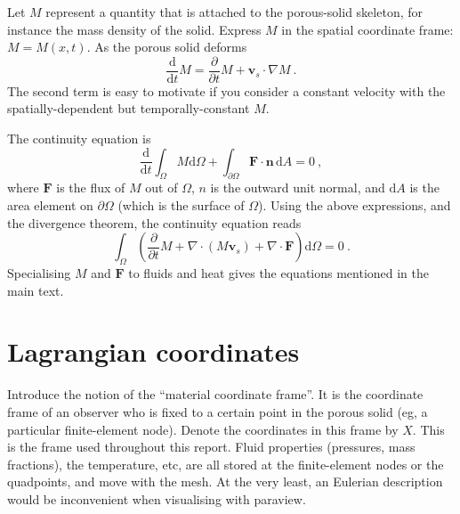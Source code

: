 \documentclass[12pt]{report}
\def\d{\mathrm{d}}
\begin{document}
Let $M$ represent a quantity that is attached to the porous-solid
skeleton, for instance the mass density of the solid.  Express $M$ in
the spatial coordinate frame: $M=M(x, t)$.  As the porous
solid deforms
\begin{equation}
\frac{\d}{\d t}M = \frac{\partial}{\partial t}M + {\mathbf v}_{s}\cdot
\nabla M \ .
\end{equation}
The second term is easy to motivate if you consider a constant
velocity with the spatially-dependent but temporally-constant $M$.

The continuity equation is
\begin{equation}
\frac{\d}{\d t}\int_{\Omega}M \d\Omega + \int_{\partial
  \Omega}{\mathbf F}\cdot{\mathbf n}\,\d A = 0 \ ,
\end{equation}
where ${\mathbf F}$ is the flux of $M$ out of $\Omega$, $n$ is the
outward unit normal, and $\d A$ is the area element on
$\partial\Omega$ (which is the surface of $\Omega$).  Using the above
expressions, and the divergence theorem, the continuity equation reads
\begin{equation}
\int_{\Omega} \left( \frac{\partial}{\partial t}M + \nabla\cdot(M{\mathbf
  v}_{s}) + \nabla\cdot{\mathbf F}  \right)\d\Omega = 0 \ .
\label{equation.continuity.eul}
\end{equation}
Specialising $M$ and ${\mathbf F}$ to fluids and heat gives the
equations mentioned in the main text.


\section{Lagrangian coordinates}

Introduce the notion of the ``material coordinate frame''.  It is the
coordinate frame of an observer who is fixed to a certain point in the
porous solid (eg, a particular finite-element node).  Denote the
coordinates in this frame by $X$.  This is the
frame used throughout this report.  Fluid properties (pressures, mass
fractions), the temperature, etc, are all stored at the finite-element
nodes or the quadpoints, and move with the mesh.  At the very least,
an Eulerian description would be inconvenient when visualising with
paraview.
\end{document}

